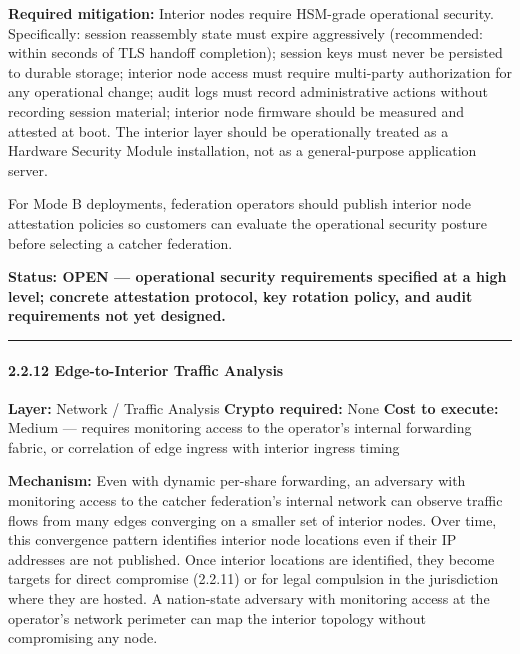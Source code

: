 \documentclass[
  11pt,
]{article}
\begin{document}
\textbf{Required mitigation:} Interior nodes require HSM-grade
operational security. Specifically: session reassembly state must expire
aggressively (recommended: within seconds of TLS handoff completion);
session keys must never be persisted to durable storage; interior node
access must require multi-party authorization for any operational
change; audit logs must record administrative actions without recording
session material; interior node firmware should be measured and attested
at boot. The interior layer should be operationally treated as a
Hardware Security Module installation, not as a general-purpose
application server.

For Mode B deployments, federation operators should publish interior
node attestation policies so customers can evaluate the operational
security posture before selecting a catcher federation.

\textbf{Status: OPEN --- operational security requirements specified at
a high level; concrete attestation protocol, key rotation policy, and
audit requirements not yet designed.}

\begin{center}\rule{0.5\linewidth}{0.5pt}\end{center}

\hypertarget{edge-to-interior-traffic-analysis}{%
\paragraph{2.2.12 Edge-to-Interior Traffic
Analysis}\label{edge-to-interior-traffic-analysis}}

\textbf{Layer:} Network / Traffic Analysis \textbf{Crypto required:}
None \textbf{Cost to execute:} Medium --- requires monitoring access to
the operator's internal forwarding fabric, or correlation of edge
ingress with interior ingress timing

\textbf{Mechanism:} Even with dynamic per-share forwarding, an adversary
with monitoring access to the catcher federation's internal network can
observe traffic flows from many edges converging on a smaller set of
interior nodes. Over time, this convergence pattern identifies interior
node locations even if their IP addresses are not published. Once
interior locations are identified, they become targets for direct
compromise (2.2.11) or for legal compulsion in the jurisdiction where
they are hosted. A nation-state adversary with monitoring access at the
operator's network perimeter can map the interior topology without
compromising any node.
\end{document}
